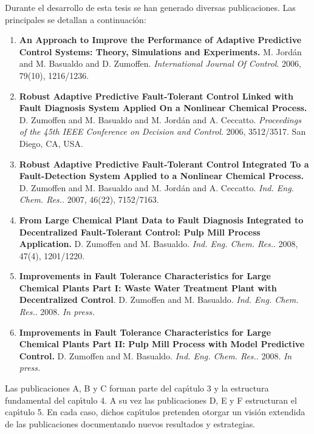Durante el desarrollo de esta tesis se han generado diversas publicaciones. Las principales se detallan a
continuaci{\'o}n:
\begin{enumerate}
\small
    \item[A-] \textbf{An Approach to Improve the Performance of Adaptive Predictive Control Systems: Theory,
    Simulations and Experiments.} M. Jord{\'a}n and M. Basualdo and D. Zumoffen. \textit{International Journal
    Of Control}. 2006, 79(10), 1216/1236.
    \item[B-] \textbf{Robust Adaptive Predictive Fault-Tolerant Control Linked with Fault Diagnosis System
    Applied On a Nonlinear Chemical Process.} D. Zumoffen and M. Basualdo and M. Jord{\'a}n and A. Ceccatto.
    \textit{Proceedings of the 45th IEEE Conference on Decision and Control}. 2006, 3512/3517. San Diego,
    CA, USA.
    \item[C-] \textbf{Robust Adaptive Predictive Fault-Tolerant Control Integrated To a Fault-Detection
    System Applied to a Nonlinear Chemical Process.} D. Zumoffen and M. Basualdo and M. Jord{\'a}n and A.
    Ceccatto. \textit{Ind. Eng.
    Chem. Res.}. 2007, 46(22), 7152/7163.
    \item[D-] \textbf{From Large Chemical Plant Data to Fault Diagnosis Integrated to Decentralized
    Fault-Tolerant Control: Pulp Mill Process Application.} D. Zumoffen and M. Basualdo. \textit{Ind. Eng.
    Chem. Res.}. 2008, 47(4), 1201/1220.
    \item[E-] \textbf{Improvements in Fault Tolerance Characteristics for Large Chemical Plants Part I:
    Waste Water Treatment Plant with Decentralized Control}. D. Zumoffen and M. Basualdo. \textit{Ind. Eng.
    Chem. Res.}. 2008. \textit{In press.}
    \item[F-] \textbf{Improvements in Fault Tolerance Characteristics for Large Chemical Plants Part II:
    Pulp Mill Process with Model Predictive Control.} D. Zumoffen and M. Basualdo. \textit{Ind. Eng. Chem.
    Res.}. 2008. \textit{In press.}
\end{enumerate}
\normalsize

Las publicaciones A, B y C forman parte del cap{\'\i}tulo 3 y la estructura fundamental del cap{\'\i}tulo 4. A su vez
las publicaciones D, E y F estructuran el cap{\'\i}tulo 5. En cada caso, dichos cap{\'\i}tulos pretenden otorgar un
visi{\'o}n extendida de las publicaciones documentando nuevos resultados y estrategias.

